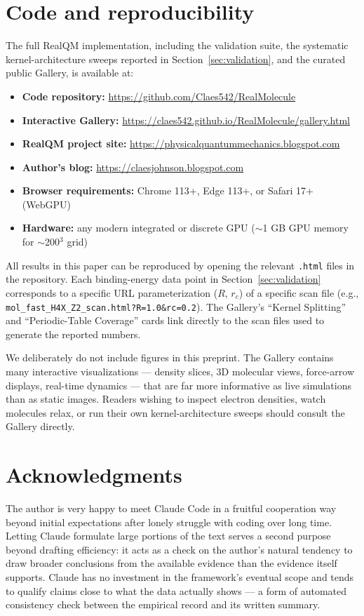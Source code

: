 \documentclass[11pt]{article}
\begin{document}
\section{Code and reproducibility}\label{sec:code}

The full RealQM implementation, including the validation suite, the systematic kernel-architecture sweeps reported in Section~\ref{sec:validation}, and the curated public Gallery, is available at:

\begin{itemize}
\item \textbf{Code repository:} \url{https://github.com/Claes542/RealMolecule}
\item \textbf{Interactive Gallery:} \url{https://claes542.github.io/RealMolecule/gallery.html}
\item \textbf{RealQM project site:} \url{https://physicalquantummechanics.blogspot.com}
\item \textbf{Author's blog:} \url{https://claesjohnson.blogspot.com}
\item \textbf{Browser requirements:} Chrome 113+, Edge 113+, or Safari 17+ (WebGPU)
\item \textbf{Hardware:} any modern integrated or discrete GPU ($\sim$1 GB GPU memory for $\sim$200$^3$ grid)
\end{itemize}

All results in this paper can be reproduced by opening the relevant \texttt{.html} files in the repository. Each binding-energy data point in Section~\ref{sec:validation} corresponds to a specific URL parameterization ($R$, $r_c$) of a specific scan file (e.g., \texttt{mol\_fast\_H4X\_Z2\_scan.html?R=1.0\&rc=0.2}). The Gallery's ``Kernel Splitting'' and ``Periodic-Table Coverage'' cards link directly to the scan files used to generate the reported numbers.

We deliberately do not include figures in this preprint. The Gallery contains many interactive visualizations --- density slices, 3D molecular views, force-arrow displays, real-time dynamics --- that are far more informative as live simulations than as static images. Readers wishing to inspect electron densities, watch molecules relax, or run their own kernel-architecture sweeps should consult the Gallery directly.

\section*{Acknowledgments}

The author is very happy to meet Claude Code in a fruitful cooperation way beyond initial expectations after lonely struggle with coding over long time. Letting Claude formulate large portions of the text serves a second purpose beyond drafting efficiency: it acts as a check on the author's natural tendency to draw broader conclusions from the available evidence than the evidence itself supports. Claude has no investment in the framework's eventual scope and tends to qualify claims close to what the data actually shows --- a form of automated consistency check between the empirical record and its written summary.
\end{document}
